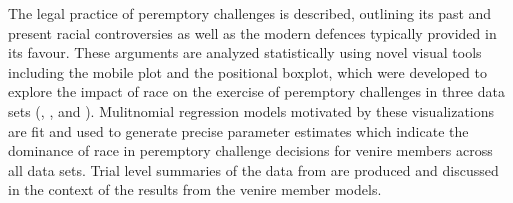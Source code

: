 The legal practice of peremptory challenges is described, outlining its past and present racial controversies as well as the
modern defences typically provided in its favour. These arguments are analyzed statistically using novel visual tools including
the mobile plot and the positional boxplot, which were developed to explore the impact of race on the exercise of peremptory
challenges in three data sets (\cite{JurySunshineProj}, \cite{StubbornLegacy}, and \cite{PerempChalMurder}). Mulitnomial
regression models motivated by these visualizations are fit and used to generate precise parameter estimates which indicate the
dominance of race in peremptory challenge decisions for venire members across all data sets. Trial level summaries of the data
from \cite{JurySunshineProj} are produced and discussed in the context of the results from the venire member models.
 

